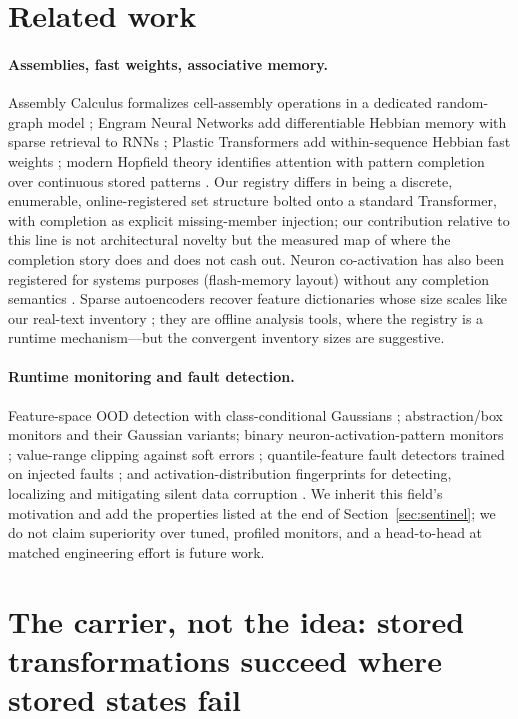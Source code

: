 \documentclass[11pt]{article}
\begin{document}
\section{Related work}
\label{sec:related}

\paragraph{Assemblies, fast weights, associative memory.} Assembly Calculus
formalizes cell-assembly operations in a dedicated random-graph model
\cite{papadimitriou}; Engram Neural Networks add differentiable Hebbian memory
with sparse retrieval to RNNs \cite{enn}; Plastic Transformers add
within-sequence Hebbian fast weights \cite{plastic}; modern Hopfield theory
identifies attention with pattern completion over continuous stored patterns
\cite{ramsauer}. Our registry differs in being a discrete, enumerable,
online-registered set structure bolted onto a standard Transformer, with
completion as explicit missing-member injection; our contribution relative to
this line is not architectural novelty but the measured map of where the
completion story does and does not cash out. Neuron co-activation has also
been registered for systems purposes (flash-memory layout) without any
completion semantics \cite{neuralink}. Sparse autoencoders recover
feature dictionaries whose size scales like our real-text inventory
\cite{sae}; they are offline analysis tools, where the registry is a runtime
mechanism---but the convergent inventory sizes are suggestive.

\paragraph{Runtime monitoring and fault detection.} Feature-space OOD
detection with class-conditional Gaussians \cite{lee}; abstraction/box
monitors \cite{henzinger} and their Gaussian variants; binary
neuron-activation-pattern monitors \cite{cheng,olber}; value-range clipping
against soft errors \cite{ranger}; quantile-feature fault detectors trained
on injected faults \cite{geissler}; and activation-distribution fingerprints
for detecting, localizing and mitigating silent data corruption
\cite{drdna}. We inherit this field's motivation and add the properties
listed at the end of Section~\ref{sec:sentinel}; we do not claim superiority
over tuned, profiled monitors, and a head-to-head at matched engineering
effort is future work.

\section{The carrier, not the idea: stored transformations succeed where stored
states fail}
\label{sec:transform}
\end{document}
